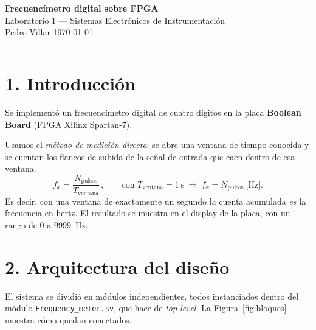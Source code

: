 \documentclass[11pt,a4paper]{article}
\begin{document}
\begin{center}
  {\large\bfseries Frecuencímetro digital sobre FPGA}\\[2pt]
  {\small Laboratorio 1 --- Sistemas Electrónicos de Instrumentación}\\[2pt]
  {\footnotesize Pedro Villar \quad\textbar\quad \today}
\end{center}
\vspace{-4pt}
\hrule
\vspace{6pt}

\section*{1. Introducción}

Se implementó un frecuencímetro digital de cuatro dígitos en la placa \textbf{Boolean Board}
(FPGA Xilinx Spartan-7).

Usamos el \emph{método de medición directa}: se abre una ventana de tiempo conocida y se
cuentan los flancos de subida de la señal de entrada que caen dentro de esa ventana. 
\[
f_x=\frac{N_{\text{pulsos}}}{T_{\text{ventana}}}\, ,
\qquad\text{con } T_{\text{ventana}}=1\ \text{s}\ \Rightarrow\ f_x = N_{\text{pulsos}}\ \text{[Hz]}.
\]
Es decir, con una ventana de exactamente un segundo la cuenta acumulada \emph{es} la frecuencia en
hertz. El resultado se muestra en el display de la placa, con un rango de $0$ a $9999$~Hz.

\section*{2. Arquitectura del diseño}

El sistema se dividió en módulos independientes, todos instanciados dentro del módulo \newline
\texttt{Frequency\_meter.sv}, que hace de \emph{top-level}. La Figura~\ref{fig:bloques} muestra cómo
quedan conectados.
\end{document}
